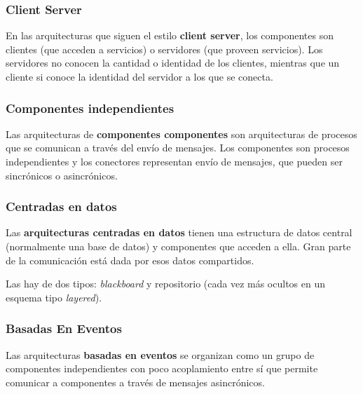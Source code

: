 \documentclass[]{article}
\begin{document}


\subsubsection{Client Server}
En las arquitecturas que siguen el estilo \textbf{client server}, los componentes son clientes (que acceden a servicios) o servidores (que proveen servicios). Los servidores no conocen la cantidad o identidad de los clientes, mientras que un cliente si conoce la identidad del servidor a los que se conecta.

\subsubsection{Componentes independientes}
Las arquitecturas de \textbf{componentes componentes} son arquitecturas de procesos que se comunican a través del envío de mensajes. Los componentes son procesos independientes y los conectores representan envío de mensajes, que pueden ser sincrónicos o asincrónicos.


\subsubsection{Centradas en datos}
Las \textbf{arquitecturas centradas en datos} tienen una estructura de datos central (normalmente una base de datos) y componentes que acceden a ella. Gran parte de la comunicación está dada por esos datos compartidos.

Las hay de dos tipos: \emph{blackboard} y repositorio (cada vez más ocultos en un esquema tipo \emph{layered}).

\subsubsection{Basadas En Eventos}
Las arquitecturas \textbf{basadas en eventos} se organizan como un grupo de componentes independientes con poco acoplamiento
entre sí que permite comunicar a componentes a través de mensajes asincrónicos.
\end{document}
